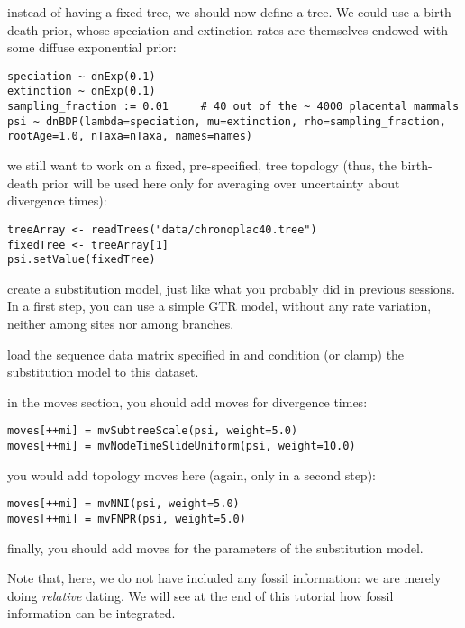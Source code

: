 instead of having a fixed tree, we should now define a  tree. We could use a birth death prior, whose speciation and extinction rates are themselves endowed with some diffuse exponential prior:
{\tt \small \begin{snugshade*}
\begin{lstlisting}
speciation ~ dnExp(0.1)
extinction ~ dnExp(0.1)
sampling_fraction := 0.01     # 40 out of the ~ 4000 placental mammals
psi ~ dnBDP(lambda=speciation, mu=extinction, rho=sampling_fraction, rootAge=1.0, nTaxa=nTaxa, names=names)
\end{lstlisting}
\end{snugshade*}}
we still want to work on a fixed, pre-specified, tree topology (thus, the birth-death prior will be used here only for averaging over uncertainty about divergence times):
{\tt \small \begin{snugshade*}
\begin{lstlisting}
treeArray <- readTrees("data/chronoplac40.tree")
fixedTree <- treeArray[1]
psi.setValue(fixedTree)
\end{lstlisting}
\end{snugshade*}}
create a substitution model, just like what you probably did in previous sessions. In a first step, you can use a simple GTR model, without any rate variation, neither among sites nor among branches.

load the sequence data matrix specified in  and condition (or clamp) the substitution model to this dataset.

in the moves section, you should add moves for divergence times:
{\tt \small \begin{snugshade*}
\begin{lstlisting}
moves[++mi] = mvSubtreeScale(psi, weight=5.0)
moves[++mi] = mvNodeTimeSlideUniform(psi, weight=10.0)
\end{lstlisting}
\end{snugshade*}}
you would add topology moves here (again, only in a second step):
{\tt \small \begin{snugshade*}
\begin{lstlisting}
moves[++mi] = mvNNI(psi, weight=5.0)
moves[++mi] = mvFNPR(psi, weight=5.0)
\end{lstlisting}
\end{snugshade*}}
finally, you should add moves for the parameters of the substitution model.

Note that, here, we do not have included any fossil information: we are merely doing \emph{relative} dating. We will see at the end of this tutorial how fossil information can be integrated.

